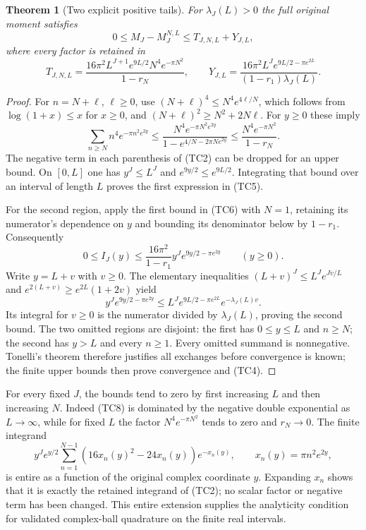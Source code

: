 \documentclass[11pt]{article}
\newtheorem{theorem}{Theorem}
\begin{document}
\begin{theorem}[Two explicit positive tails]
For $\lambda_J(L)>0$ the full original moment satisfies
\[
0\le M_J-M_J^{N,L}\le T_{J,N,L}+Y_{J,L},
\tag{TC4}
\]
where every factor is retained in
\[
T_{J,N,L}
=\frac{16\pi^2L^{J+1}e^{9L/2}N^4e^{-\pi N^2}}{1-r_N},
\qquad
Y_{J,L}
=\frac{16\pi^2L^Je^{9L/2-\pi e^{2L}}}
{(1-r_1)\lambda_J(L)}.
\tag{TC5}
\]
\end{theorem}
\begin{proof}
For $n=N+\ell$, $\ell\ge0$, use
$(N+\ell)^4\le N^4e^{4\ell/N}$, which follows from
$\log(1+x)\le x$ for $x\ge0$, and
$(N+\ell)^2\ge N^2+2N\ell$. For $y\ge0$ these imply
\[
\sum_{n\ge N}n^4e^{-\pi n^2e^{2y}}
\le
\frac{N^4e^{-\pi N^2e^{2y}}}
{1-e^{4/N-2\pi Ne^{2y}}}
\le\frac{N^4e^{-\pi N^2}}{1-r_N}.
\tag{TC6}
\]
The negative term in each parenthesis of (TC2) can be dropped for
an upper bound. On $[0,L]$ one has $y^J\le L^J$ and
$e^{9y/2}\le e^{9L/2}$. Integrating that bound over an interval
of length $L$ proves the first expression in (TC5).

For the second region, apply the first bound in (TC6) with $N=1$,
retaining its numerator's dependence on $y$ and bounding its
denominator below by $1-r_1$. Consequently
\[
0\le I_J(y)\le
\frac{16\pi^2}{1-r_1}y^Je^{9y/2-\pi e^{2y}}
\qquad(y\ge0).
\tag{TC7}
\]
Write $y=L+v$ with $v\ge0$. The elementary inequalities
$(L+v)^J\le L^Je^{Jv/L}$ and
$e^{2(L+v)}\ge e^{2L}(1+2v)$ yield
\[
y^Je^{9y/2-\pi e^{2y}}
\le L^Je^{9L/2-\pi e^{2L}}e^{-\lambda_J(L)v}.
\tag{TC8}
\]
Its integral for $v\ge0$ is the numerator divided by
$\lambda_J(L)$, proving the second bound.
The two omitted regions are disjoint: the first has $0\le y\le L$
and $n\ge N$; the second has $y>L$ and every $n\ge1$.
Every omitted summand is nonnegative. Tonelli's theorem therefore
justifies all exchanges before convergence is known; the finite
upper bounds then prove convergence and (TC4).
\end{proof}

For every fixed $J$, the bounds tend to zero by first increasing $L$
and then increasing $N$. Indeed (TC8) is dominated by the negative
double exponential as $L\to\infty$, while for fixed $L$ the factor
$N^4e^{-\pi N^2}$ tends to zero and $r_N\to0$.
The finite integrand
\[
y^J e^{y/2}\sum_{n=1}^{N-1}(16x_n(y)^2-24x_n(y))e^{-x_n(y)},
\qquad x_n(y)=\pi n^2e^{2y},
\tag{TC9}
\]
is entire as a function of the original complex coordinate $y$.
Expanding $x_n$ shows that it is exactly the retained integrand
of (TC2); no scalar factor or negative term has been changed.
This entire extension supplies the analyticity condition for
validated complex-ball quadrature on the finite real intervals.
\end{document}
